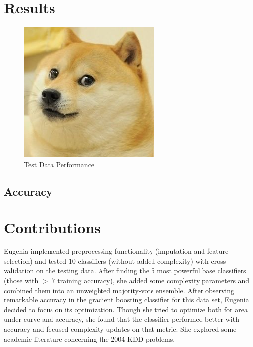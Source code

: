 \documentclass{article}
\begin{document}

\section{Results}
\label{results}

\begin{figure}[!h]
\centering
\includegraphics{placeholder}
\caption{Test Data Performance}
\label{fig:placeholder3}
\end{figure}

\subsection{Accuracy}


\section{Contributions}

Eugenia implemented preprocessing functionality (imputation and feature selection) and tested 10 classifiers (without added complexity) with cross-validation on the testing data. 
After finding the 5 most powerful base classifiers (those with $> .7$ training accuracy), she added some complexity parameters and combined them into an unweighted majority-vote ensemble. 
After observing remarkable accuracy in the gradient boosting classifier for this data set, Eugenia decided to focus on its optimization.
Though she tried to optimize both for area under curve and accuracy, she found that the classifier performed better with accuracy and focused complexity updates on that metric.
She explored some academic literature concerning the 2004 KDD problems.
\end{document}
